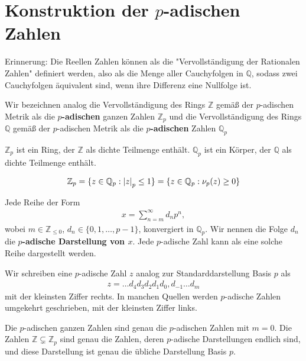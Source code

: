 \documentclass{report}
\newcommand*{\newpar}{\par\vspace{\baselineskip}\noindent}
\newcommand{\tbf}[1]{\textbf{#1}}
\newcommand{\bQ}{\mathbb{Q}}
\newcommand{\bZ}{\mathbb{Z}}
\begin{document}
	\section{Konstruktion der $p$-adischen Zahlen}
	Erinnerung: Die Reellen Zahlen können als die "Vervollständigung der Rationalen Zahlen" definiert werden, also als die Menge aller Cauchyfolgen in $\bQ$, sodass zwei Cauchyfolgen äquivalent sind, wenn ihre Differenz eine Nullfolge ist.
	\begin{definition}
		Wir bezeichnen analog die Vervollständigung des Rings $\bZ$ gemäß der $p$-adischen Metrik als die \tbf{$p$-adischen} ganzen Zahlen $\bZ_p$ und die Vervollständigung des Rings $\bQ$ gemäß der $p$-adischen Metrik als die \tbf{$p$-adischen} Zahlen $\bQ_p$
	\end{definition}
	\begin{proposition}
		$\bZ_p$ ist ein Ring, der $\bZ$ als dichte Teilmenge enthält. $\bQ_p$ ist ein Körper, der $\bQ$ als dichte Teilmenge enthält.
	\end{proposition}
	\begin{proposition}
		\begin{align*}
			\bZ_p = \{z \in \bQ_p : \abs{z}_p \leq 1\} = \{z \in \bQ_p : \nu_p(z) \geq 0\}
		\end{align*}
	\end{proposition}
	\begin{proposition}
		Jede Reihe der Form
		\begin{align*}
			x = \sum_{n = m}^\infty d_n p^n,
		\end{align*}
		wobei $m \in \bZ_{\leq 0}$, $d_n \in \{0,1,\hdots,p-1\}$, konvergiert in $\bQ_p$. Wir nennen die Folge $d_n$ die \tbf{$p$-adische Darstellung von $x$}. Jede $p$-adische Zahl kann als eine solche Reihe dargestellt werden.
	\end{proposition}
	\noindent Wir schreiben eine $p$-adische Zahl $z$ analog zur Standarddarstellung Basis $p$ als 
	\begin{align*}
		z = \hdots d_4 d_3 d_2 d_1 d_0, d_{-1} \hdots d_{m}
	\end{align*}
	mit der kleinsten Ziffer rechts. In manchen Quellen werden $p$-adische Zahlen umgekehrt geschrieben, mit der kleinsten Ziffer links.
	\newpar
	\noindent Die $p$-adischen ganzen Zahlen sind genau die $p$-adischen Zahlen mit $m = 0$. Die Zahlen $\bZ \subsetneq \bZ_p$ sind genau die Zahlen, deren $p$-adische Darstellungen endlich sind, und diese Darstellung ist genau die übliche Darstellung Basis $p$.
\end{document}
